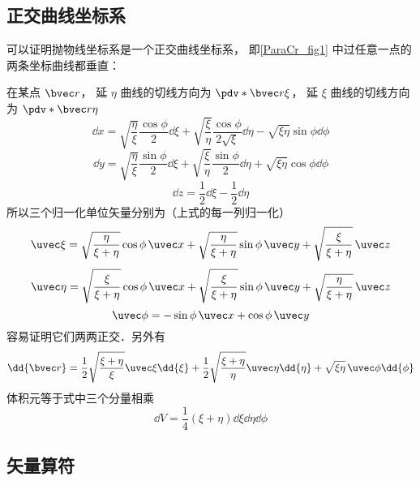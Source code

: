
\subsection{正交曲线坐标系}
可以证明抛物线坐标系是一个正交曲线坐标系， 即\autoref{ParaCr_fig1} 中过任意一点的两条坐标曲线都垂直：

在某点 $\bvec r$， 延 $\eta$ 曲线的切线方向为 $\pdv*{\bvec r}{\xi}$， 延 $\xi$ 曲线的切线方向为 $\pdv*{\bvec r}{\eta}$
\begin{equation}
\dd{x} = \sqrt{\frac{\eta}{\xi}}\frac{\cos\phi}{2}\dd{\xi} + \sqrt{\frac{\xi}{\eta}}\frac{\cos\phi}{2\sqrt{\xi}}\dd{\eta} - \sqrt{\xi\eta}\sin\phi\dd{\phi}
\end{equation}
\begin{equation}
\dd{y} = \sqrt{\frac{\eta}{\xi}}\frac{\sin\phi}{2}\dd{\xi} + \sqrt{\frac{\xi}{\eta}}\frac{\sin\phi}{2}\dd{\eta} + \sqrt{\xi\eta}\cos\phi\dd{\phi}
\end{equation}
\begin{equation}
\dd{z} = \frac{1}{2}\dd{\xi} - \frac{1}{2}\dd{\eta}
\end{equation}
所以三个归一化单位矢量分别为（上式的每一列归一化）
\begin{equation}
\uvec \xi = \sqrt{\frac{\eta}{\xi+\eta}}\cos\phi\,\uvec x + \sqrt{\frac{\eta}{\xi+\eta}}\sin\phi\,\uvec y + \sqrt{\frac{\xi}{\xi+\eta}}\,\uvec z
\end{equation}
\begin{equation}
\uvec \eta = \sqrt{\frac{\xi}{\xi+\eta}}\cos\phi\,\uvec x + \sqrt{\frac{\xi}{\xi+\eta}}\sin\phi\,\uvec y + \sqrt{\frac{\eta}{\xi+\eta}}\,\uvec z
\end{equation}
\begin{equation}
\uvec \phi = -\sin\phi \,\uvec x + \cos\phi \,\uvec y
\end{equation}
容易证明它们两两正交．另外有
\begin{equation}\label{ParaCr_eq4}
\dd{\bvec r} = \frac{1}{2}\sqrt{\frac{\xi + \eta}{\xi}} \uvec \xi \dd{\xi}
+ \frac{1}{2}\sqrt{\frac{\xi + \eta}{\eta}} \uvec \eta \dd{\eta}
+ \sqrt{\xi\eta}\, \uvec \phi \dd{\phi}
\end{equation}
体积元等于式中三个分量相乘
\begin{equation}
\dd{V} = \frac{1}{4} (\xi + \eta) \dd{\xi}\dd{\eta}\dd{\phi}
\end{equation}

\subsection{矢量算符}

